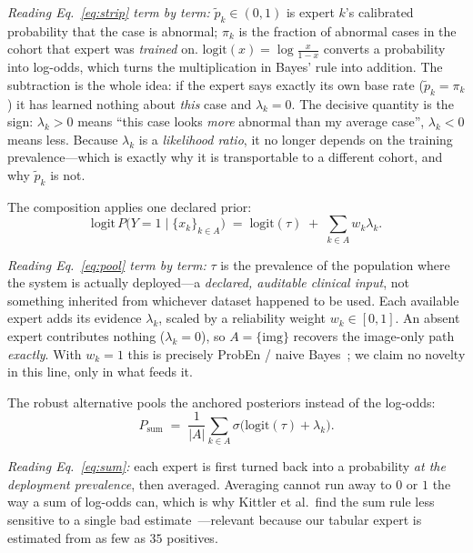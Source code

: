 \documentclass[sigplan,nonacm,screen]{acmart}
\begin{document}
\emph{Reading Eq.~\eqref{eq:strip} term by term:} $\tilde p_k\in(0,1)$ is expert $k$'s calibrated probability that the case is abnormal; $\pi_k$ is the fraction of abnormal cases in the cohort that expert was \emph{trained} on. $\mathrm{logit}(x)=\log\frac{x}{1-x}$ converts a probability into log-odds, which turns the multiplication in Bayes' rule into addition. The subtraction is the whole idea: if the expert says exactly its own base rate ($\tilde p_k=\pi_k$) it has learned nothing about \emph{this} case and $\lambda_k=0$. The decisive quantity is the sign: $\lambda_k>0$ means ``this case looks \emph{more} abnormal than my average case'', $\lambda_k<0$ means less. Because $\lambda_k$ is a \emph{likelihood ratio}, it no longer depends on the training prevalence---which is exactly why it is transportable to a different cohort, and why $\tilde p_k$ is not.

The composition applies one declared prior:
\begin{equation}
\mathrm{logit}\,P\big(Y{=}1\mid \{x_k\}_{k\in A}\big) \;=\; \mathrm{logit}(\tau) \;+\; \sum_{k\in A} w_k \lambda_k .
\label{eq:pool}
\end{equation}

\emph{Reading Eq.~\eqref{eq:pool} term by term:} $\tau$ is the prevalence of the population where the system is actually deployed---a \emph{declared, auditable clinical input}, not something inherited from whichever dataset happened to be used. Each available expert adds its evidence $\lambda_k$, scaled by a reliability weight $w_k\in[0,1]$. An absent expert contributes nothing ($\lambda_k=0$), so $A=\{\mathrm{img}\}$ recovers the image-only path \emph{exactly}. With $w_k=1$ this is precisely ProbEn / naive Bayes~\cite{chen2022proben}; we claim no novelty in this line, only in what feeds it.

The robust alternative pools the anchored posteriors instead of the log-odds:
\begin{equation}
P_{\mathrm{sum}} \;=\; \frac{1}{|A|}\sum_{k\in A}\sigma\big(\mathrm{logit}(\tau)+\lambda_k\big).
\label{eq:sum}
\end{equation}

\emph{Reading Eq.~\eqref{eq:sum}:} each expert is first turned back into a probability \emph{at the deployment prevalence}, then averaged. Averaging cannot run away to $0$ or $1$ the way a sum of log-odds can, which is why Kittler et al.\ find the sum rule less sensitive to a single bad estimate~\cite{kittler1998combining}---relevant because our tabular expert is estimated from as few as $35$ positives.
\end{document}
